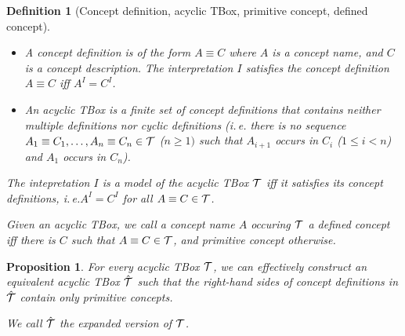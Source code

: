 \documentclass[openany]{scrbook}
\theoremstyle{break}
\newtheorem{Definition}[Theorem]{Definition}
\newtheorem{Proposition}[Theorem]{Proposition}
\theoremstyle{nonumberbreak}
\theoremstyle{nonumberplain}
\theoremstyle{nonumberbreak}
\newcommand{\ie}{i{.}\,e{.}\xspace}
\begin{document}
\begin{Definition}[Concept definition, acyclic TBox, primitive
  concept, defined concept]
  \begin{itemize}
  \item A concept definition is of the form $A \equiv C$ where $A$ is
    a concept name, and $C$ is a concept description. The
    interpretation $I$ satisfies the concept definition $A \equiv C$
    iff $A^I = C^I$.
  \item An acyclic TBox is a finite set of concept definitions that
    contains neither multiple definitions nor cyclic definitions (\ie
    there is no sequence $A_1 \equiv C_1, \dotsc, A_n \equiv C_n \in
    {\cal T}$ ($n \geq 1)$ such that $A_{i + 1}$ occurs in $C_i$ ($1
    \leq i < n$) and $A_1$ occurs in $C_n$).
  \end{itemize}

  The intepretation $I$ is a model of the acyclic TBox ${\cal T}$ iff
  it satisfies its concept definitions, \ie $A^I = C^I$ for all $A
  \equiv C \in {\cal T}$.

  Given an acyclic TBox, we call a concept name $A$ occuring ${\cal
    T}$ a defined concept iff there is $C$ such that $A \equiv C \in
  {\cal T}$, and primitive concept otherwise.
\end{Definition}

\begin{Proposition}
  \label{2.6}
  For every acyclic TBox ${\cal T}$, we can effectively construct an
  equivalent acyclic TBox $\hat{{\cal T}}$ such that the right-hand
  sides of concept definitions in $\hat{{\cal T}}$ contain only
  primitive concepts.

  We call $\hat{{\cal T}}$ the expanded version of ${\cal T}$.
\end{Proposition}
\end{document}
